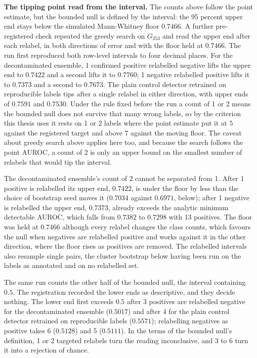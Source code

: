 \textbf{The tipping point read from the interval.} The counts above follow the point estimate, but the bounded null
is defined by the interval: the 95 percent upper end stays below the simulated Mann-Whitney floor $0.7466$. A further pre-registered check repeated the greedy search on $G_{253}$ and read the upper end after each relabel, in both directions of error and with the floor held at $0.7466$. The run first
reproduced both row-level intervals to four decimal places. For the decontaminated ensemble, 1 confirmed positive
relabelled negative lifts the upper end to $0.7422$ and a second lifts it to $0.7760$; 1 negative relabelled positive
lifts it to $0.7373$ and a second to $0.7673$. The plain control detector retrained on reproducible labels tips after
a single relabel in either direction, with upper ends of $0.7591$ and $0.7530$. Under the rule fixed before the run a count of 1
or 2 means the bounded null does not survive that many wrong labels, so by the
criterion this thesis uses it rests on 1 or 2 labels where the point estimate
put it at $5$ against the registered target and above $7$ against the moving floor. The caveat about greedy search above applies here too, and because the search follows the point AUROC, a count of 2
is only an upper bound on the smallest number of relabels that would tip the interval.

The decontaminated ensemble's count of 2 cannot be separated from 1. After 1 positive is relabelled its upper end,
$0.7422$, is under the floor by less than the choice of bootstrap seed moves it ($0.7034$ against $0.6971$, below);
after 1 negative is relabelled the upper end, $0.7373$, already exceeds the analytic minimum detectable AUROC, which
falls from $0.7382$ to $0.7298$ with 13 positives. The floor was held at $0.7466$ although every relabel changes the
class counts, which favours the null when negatives are relabelled positive and works against it in the other
direction, where the floor rises as positives are removed. The relabelled intervals also resample single pairs, the
cluster bootstrap below having been run on the labels as annotated and on no relabelled set.

The same run counts the other half of the bounded null, the interval containing $0.5$. The registration recorded the
lower ends as descriptive, and they decide nothing. The lower end first exceeds $0.5$ after 3 positives are relabelled
negative for the decontaminated ensemble ($0.5017$) and after 4 for the plain control detector retrained on
reproducible labels ($0.5571$); relabelling negatives as positive takes 6 ($0.5128$) and 5 ($0.5111$). In the terms
of the bounded null's definition, 1 or 2 targeted relabels turn the reading inconclusive, and 3 to 6 turn it into a
rejection of chance.


